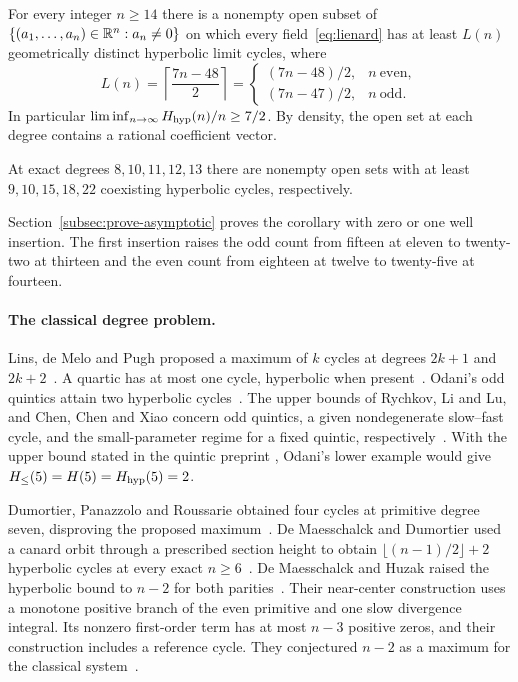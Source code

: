 \documentclass[11pt]{article}
\begin{document}
\begin{theorem}\label{thm:main-asymptotic}
For every integer $n\ge14$ there is a nonempty open subset of
$\{(a_1,\ldots,a_n)\in\mathbb{R}^n:a_n\ne0\}$ on which every field~\eqref{eq:lienard}
has at least $L(n)$ geometrically distinct hyperbolic limit cycles, where
\begin{equation}\label{eq:parity-bounds}
 L(n)=\left\lceil\frac{7n-48}{2}\right\rceil
 =\begin{cases}(7n-48)/2,& n\ \mathrm{even},\\ (7n-47)/2,& n\ \mathrm{odd}.\end{cases}
\end{equation}
In particular $\liminf_{n\to\infty}H_{\mathrm{hyp}}(n)/n\ge7/2$. By density, the
open set at each degree contains a rational coefficient vector.
\end{theorem}

\begin{corollary}\label{cor:octic-low}
At exact degrees $8,10,11,12,13$ there are nonempty open sets with at
least $9,10,15,18,22$ coexisting hyperbolic cycles, respectively.
\end{corollary}
Section~\ref{subsec:prove-asymptotic} proves the corollary with zero or
one well insertion. The first insertion raises the odd count from
fifteen at eleven to twenty-two at thirteen and the even count from
eighteen at twelve to twenty-five at fourteen.

\paragraph{The classical degree problem.}
Lins, de Melo and Pugh proposed a maximum of $k$ cycles at degrees
$2k+1$ and $2k+2$~\cite[pp.~335--336]{LMP1977}. A quartic has at most
one cycle, hyperbolic when present~\cite[Theorem~1.1]{LiLlibre2012}.
Odani's odd quintics attain two hyperbolic cycles~\cite{Odani1996}.
The upper bounds of Rychkov, Li and Lu, and Chen, Chen and Xiao concern
odd quintics, a given nondegenerate slow--fast cycle, and the small-parameter
regime for a fixed quintic, respectively~\cite{Rychkov1975,LiLu2014,CCX2026}.
With the upper bound stated in the quintic preprint
\cite[Theorem~1.1]{OpenAIQuintic2026}, Odani's lower example would give
$H_{\le}(5)=H(5)=H_{\mathrm{hyp}}(5)=2$.

Dumortier, Panazzolo and Roussarie obtained four cycles at primitive
degree seven, disproving the proposed maximum~\cite[Theorems~1.1 and
1.3]{DPR2007}. De Maesschalck and Dumortier used a canard orbit through
a prescribed section height to obtain $\lfloor(n-1)/2\rfloor+2$
hyperbolic cycles at every exact $n\ge6$~\cite[Theorem~2 and
Proposition~1]{DMD2011}. De Maesschalck and Huzak raised the
hyperbolic bound to $n-2$ for both parities~\cite[Theorem~1]{DMH2015}.
Their near-center construction uses a monotone positive branch of the even primitive and one slow divergence integral.
Its nonzero first-order term has at most $n-3$ positive zeros, and their
construction includes a reference cycle. They conjectured $n-2$ as a
maximum for the classical system~\cite[Proposition~3 and Remark~2]{DMH2015}.
\end{document}
